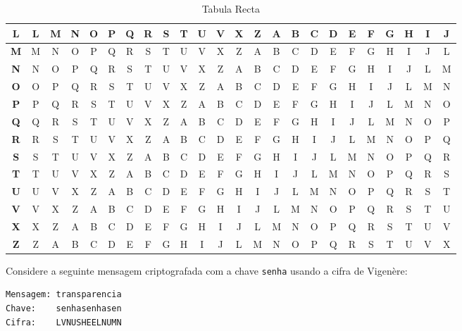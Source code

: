 \begin{table}[htbp]
\begin{small}
\begin{tabular}{|@{}c@{}|*{23}{@{}c@{}|}}
\hline
\textbf{L} & L & M & N & O & P & Q & R & S & T & U & V & X & Z & A & B & C & D & E & F & G & H & I & J \\
\hline
\textbf{M} & M & N & O & P & Q & R & S & T & U & V & X & Z & A & B & C & D & E & F & G & H & I & J & L \\
\hline
\textbf{N} & N & O & P & Q & R & S & T & U & V & X & Z & A & B & C & D & E & F & G & H & I & J & L & M \\
\hline
\textbf{O} & O & P & Q & R & S & T & U & V & X & Z & A & B & C & D & E & F & G & H & I & J & L & M & N \\
\hline
\textbf{P} & P & Q & R & S & T & U & V & X & Z & A & B & C & D & E & F & G & H & I & J & L & M & N & O \\
\hline
\textbf{Q} & Q & R & S & T & U & V & X & Z & A & B & C & D & E & F & G & H & I & J & L & M & N & O & P \\
\hline
\textbf{R} & R & S & T & U & V & X & Z & A & B & C & D & E & F & G & H & I & J & L & M & N & O & P & Q \\
\hline
\textbf{S} & S & T & U & V & X & Z & A & B & C & D & E & F & G & H & I & J & L & M & N & O & P & Q & R \\
\hline
\textbf{T} & T & U & V & X & Z & A & B & C & D & E & F & G & H & I & J & L & M & N & O & P & Q & R & S \\
\hline
\textbf{U} & U & V & X & Z & A & B & C & D & E & F & G & H & I & J & L & M & N & O & P & Q & R & S & T \\
\hline
\textbf{V} & V & X & Z & A & B & C & D & E & F & G & H & I & J & L & M & N & O & P & Q & R & S & T & U \\
\hline
\textbf{X} & X & Z & A & B & C & D & E & F & G & H & I & J & L & M & N & O & P & Q & R & S & T & U & V \\
\hline
\textbf{Z} & Z & A & B & C & D & E & F & G & H & I & J & L & M & N & O & P & Q & R & S & T & U & V & X \\
\hline
\end{tabular}
\end{small}
\caption{Tabula Recta}
\label{tab:tabula-recta}
\end{table}


\begin{example}
  Considere a seguinte mensagem criptografada com a chave {\tt senha} usando a cifra de Vigenère:

\begin{verbatim}
Mensagem: transparencia
Chave:    senhasenhasen
Cifra:    LVNUSHEELNUMN
\end{verbatim}
\end{example}

